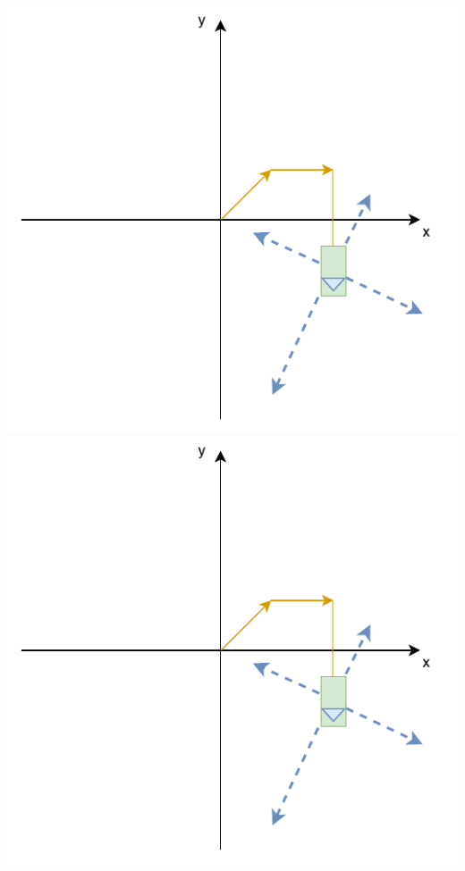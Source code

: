 \begin{center}
	\includegraphics[page=1,scale=0.6]{sources/mapping/orientation_objectdistance.pdf}
	\includegraphics[page=2,scale=0.6]{sources/mapping/orientation_objectdistance.pdf}

\end{center}
